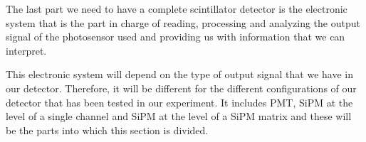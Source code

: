 The last part we need to have a complete scintillator detector is the electronic system that is the part in charge of reading, processing and analyzing the output signal of the photosensor used and providing us with information that we can interpret.

This electronic system will depend on the type of output signal that we have in our detector. Therefore, it will be different for the different configurations of our detector that has been tested in our experiment. It includes PMT, SiPM at the level of a single channel and SiPM at the level of a SiPM matrix and these will be the parts into which this section is divided.


 